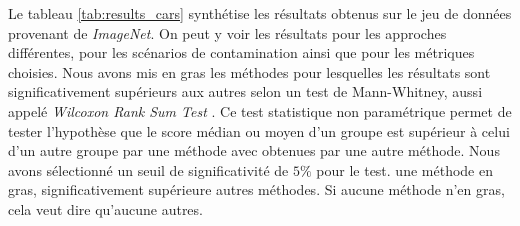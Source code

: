 Le tableau \ref{tab:results_cars} synthétise les résultats obtenus sur le jeu de données provenant de \textit{ImageNet}. On peut y voir les résultats pour les \DIFdelbegin {}\DIFdelend \DIFaddbegin {}\DIFaddend approches différentes, pour les \DIFdelbegin {}\DIFdelend \DIFaddbegin {}\DIFaddend scénarios de contamination ainsi que pour les \DIFdelbegin {}\DIFdelend \DIFaddbegin {}\DIFaddend métriques choisies. Nous avons mis en gras les méthodes pour lesquelles les résultats sont significativement supérieurs aux autres selon un test de Mann-Whitney, aussi appelé \textit{Wilcoxon Rank Sum Test} \citep{Mann47}. Ce test statistique non paramétrique permet de tester l'hypothèse que le score médian ou moyen d'un groupe est supérieur à celui d'un autre groupe \DIFdelbegin {}\DIFdelend \DIFaddbegin {}\DIFaddend par une méthode avec \DIFdelbegin {}\DIFdelend \DIFaddbegin {}\DIFaddend obtenues par une autre méthode. \DIFaddbegin {}\DIFaddend Nous avons sélectionné un seuil de significativité de $5 \%$ pour le test. \DIFdelbegin {}\DIFdelend \DIFaddbegin {}\DIFaddend une méthode \DIFdelbegin {}\DIFdelend \DIFaddbegin {}\DIFaddend en gras, \DIFdelbegin {}\DIFdelend \DIFaddbegin {}\DIFaddend significativement supérieure \DIFdelbegin {}\DIFdelend \DIFaddbegin {}\DIFaddend autres méthodes\DIFdelbegin {}\DIFdelend \DIFaddbegin {}\DIFaddend . Si aucune méthode n'\DIFdelbegin {}\DIFdelend \DIFaddbegin {}\DIFaddend en gras, cela veut dire qu'aucune \DIFdelbegin {}\DIFdelend \DIFaddbegin {}\DIFaddend autres.

